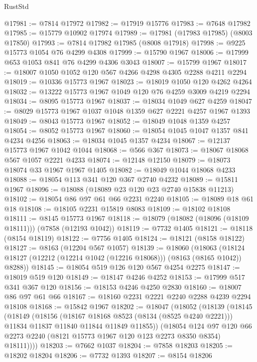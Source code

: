 \begin{lexlean}{RustStd}
\begin{coremodule}
@17981 := @7814 @17972
@17982 := @17919 @15776
@17983 := @7648 @17982
@17985 := @15779 @10902 @17974
@17989 := @17981 (@17983 @17985) (@8003 @17850)
@17993 := @7814 @17982 @17985 (@8008 @17918)
@17998 := @9225 @15773 @1054 @76 @4299 @4308
@17999 := @15790 @1967
@18006 := @17999 @653 @1053 @841 @76 @4299 @4306 @3043
@18007 := @15799 @1967
@18017 := @18007 @1050 @1052 @120 @567 @4266 @4298 @4305 @2288 @4211 @2294
@18019 := @10336 @15773 @1967
@18023 := @18019 @1050 @120 @4262 @4264
@18032 := @13222 @15773 @1967 @1049 @120 @76 @4259 @3009 @4219 @2294
@18034 := @8095 @15773 @1967
@18037 := @18034 @1049 @627 @4259
@18047 := @8029 @15773 @1967 @1037 @1048 @1359 @627 @2221 @4257 @1967 @1393
@18049 := @8043 @15773 @1967
@18052 := @18049 @1048 @1359 @4257
@18054 := @8052 @15773 @1967
@18060 := @18054 @1045 @1047 @1357 @841 @4234 @4256
@18063 := @18034 @1045 @1357 @4234
@18067 := @12137 @15773 @1967 @1042 @1044
@18068 := @566 @367
@18073 := @18067 @18068 @567 @1057 @2221 @4233
@18074 := @12148 @12150
@18079 := @18073 @18074 @33 @1967 @1967 @1405
@18082 := @18049 @1044 @18068 @4233
@18088 := @18054 @113 @341 @120 @367 @2740 @4232
@18089 := @15811 @1967
@18096 := @18088 (@18089 @23 @120 @23 @2740 @15838 @11213)
@18102 := @18054 @86 @97 @61 @66 @2231 @2240
@18105 := @18089 @18 @61 @18
@18108 := @18105 @2231 @15819 @8083
@18109 := @18102 @18108
@18111 := @8145 @15773 @1967
@18118 := @18079 (@18082 (@18096 (@18109 @18111))) (@7858 (@12193 @1042))
@18119 := @7732 @1405
@18121 := @18118 (@8154 @18119)
@18122 := @7756 @1405
@18124 := @18121 (@8158 @18122)
@18127 := @8163 (@12204 @567 @1057)
@18139 := @18060
    (@18063 (@18124 @18127 (@12212 (@12214 @1042 (@12216 @18068))) (@8163 (@8165 @1042)) @8288))
@18145 := @18054 @519 @126 @120 @567 @4254 @2275
@18147 := @18019 @519 @120
@18149 := @18147 @4246 @4252
@18153 := @17999 @517 @341 @367 @120
@18156 := @18153 @4246 @4250 @2830
@18160 := @18007 @86 @97 @61 @66
@18167 := @18160 @2231 @2221 @2240 @2288 @4239 @2294 @18108
@18168 := @15842 @1967
@18202 := @18047
    (@18052
      (@18139
        (@18145
          (@18149
            (@18156
              (@18167 @18168 @8523 (@8134 (@8525 @4240 @2221)))
              @11834
              @11837
              @11840
              @11844
              @11849
              @11855))
          (@18054
            @124
            @97
            @120
            @66
            @2273
            @2240
            (@8121 @15773 @1967 @120 @123 @2273 @8350 @8354)
            @18111))))
@18203 := @7662 @1037
@18204 := @7858 @18203
@18205 := @18202 @18204
@18206 := @7732 @1393
@18207 := @8154 @18206

\end{coremodule}
\end{lexlean}
